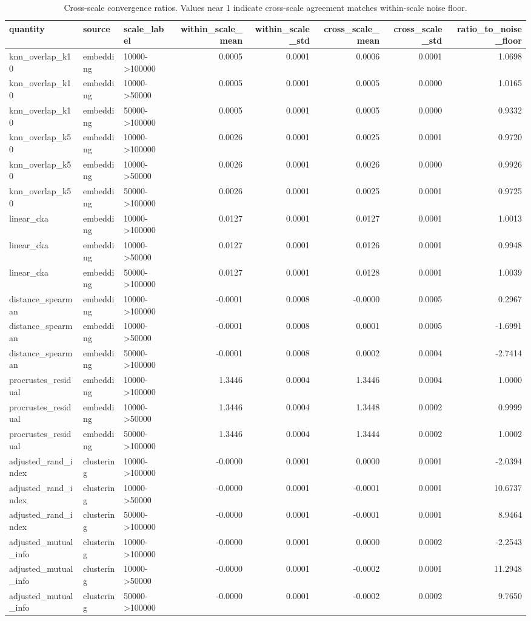 \begin{table}
\caption{Cross-scale convergence ratios. Values near 1 indicate cross-scale agreement matches within-scale noise floor.}
\label{tab:convergence}
\begin{tabular}{lllrrrrr}
\toprule
quantity & source & scale_label & within_scale_mean & within_scale_std & cross_scale_mean & cross_scale_std & ratio_to_noise_floor \\
\midrule
knn_overlap_k10 & embedding & 10000->100000 & 0.0005 & 0.0001 & 0.0006 & 0.0001 & 1.0698 \\
knn_overlap_k10 & embedding & 10000->50000 & 0.0005 & 0.0001 & 0.0005 & 0.0000 & 1.0165 \\
knn_overlap_k10 & embedding & 50000->100000 & 0.0005 & 0.0001 & 0.0005 & 0.0000 & 0.9332 \\
knn_overlap_k50 & embedding & 10000->100000 & 0.0026 & 0.0001 & 0.0025 & 0.0001 & 0.9720 \\
knn_overlap_k50 & embedding & 10000->50000 & 0.0026 & 0.0001 & 0.0026 & 0.0000 & 0.9926 \\
knn_overlap_k50 & embedding & 50000->100000 & 0.0026 & 0.0001 & 0.0025 & 0.0001 & 0.9725 \\
linear_cka & embedding & 10000->100000 & 0.0127 & 0.0001 & 0.0127 & 0.0001 & 1.0013 \\
linear_cka & embedding & 10000->50000 & 0.0127 & 0.0001 & 0.0126 & 0.0001 & 0.9948 \\
linear_cka & embedding & 50000->100000 & 0.0127 & 0.0001 & 0.0128 & 0.0001 & 1.0039 \\
distance_spearman & embedding & 10000->100000 & -0.0001 & 0.0008 & -0.0000 & 0.0005 & 0.2967 \\
distance_spearman & embedding & 10000->50000 & -0.0001 & 0.0008 & 0.0001 & 0.0005 & -1.6991 \\
distance_spearman & embedding & 50000->100000 & -0.0001 & 0.0008 & 0.0002 & 0.0004 & -2.7414 \\
procrustes_residual & embedding & 10000->100000 & 1.3446 & 0.0004 & 1.3446 & 0.0004 & 1.0000 \\
procrustes_residual & embedding & 10000->50000 & 1.3446 & 0.0004 & 1.3448 & 0.0002 & 0.9999 \\
procrustes_residual & embedding & 50000->100000 & 1.3446 & 0.0004 & 1.3444 & 0.0002 & 1.0002 \\
adjusted_rand_index & clustering & 10000->100000 & -0.0000 & 0.0001 & 0.0000 & 0.0001 & -2.0394 \\
adjusted_rand_index & clustering & 10000->50000 & -0.0000 & 0.0001 & -0.0001 & 0.0001 & 10.6737 \\
adjusted_rand_index & clustering & 50000->100000 & -0.0000 & 0.0001 & -0.0001 & 0.0001 & 8.9464 \\
adjusted_mutual_info & clustering & 10000->100000 & -0.0000 & 0.0001 & 0.0000 & 0.0002 & -2.2543 \\
adjusted_mutual_info & clustering & 10000->50000 & -0.0000 & 0.0001 & -0.0002 & 0.0001 & 11.2948 \\
adjusted_mutual_info & clustering & 50000->100000 & -0.0000 & 0.0001 & -0.0002 & 0.0002 & 9.7650 \\
\bottomrule
\end{tabular}
\end{table}
